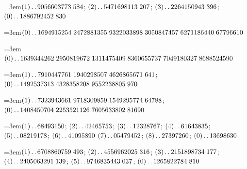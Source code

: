 \par\noindent\hangindent=3em\enspace $(1)\mathinner{.\,.}9056603773\;\allowbreak 584$; $(2)\mathinner{.\,.}5471698113\;\allowbreak 207$; $(3)\mathinner{.\,.}2264150943\;\allowbreak 396$; $(0)\mathinner{.\,.}1886792452\;\allowbreak 830$\par\smallskip

\par\noindent\hangindent=3em\enspace $(0)\mathinner{.\,.}1694915254\;\allowbreak 2472881355\;\allowbreak 9322033898\;\allowbreak 3050847457\;\allowbreak 6271186440\;\allowbreak 67796610$\par\smallskip

\par\noindent\hangindent=3em\enspace $(0)\mathinner{.\,.}1639344262\;\allowbreak 2950819672\;\allowbreak 1311475409\;\allowbreak 8360655737\;\allowbreak 7049180327\;\allowbreak 8688524590$\par\smallskip

\par\noindent\hangindent=3em\enspace $(1)\mathinner{.\,.}7910447761\;\allowbreak 1940298507\;\allowbreak 4626865671\;\allowbreak 641$; $(0)\mathinner{.\,.}1492537313\;\allowbreak 4328358208\;\allowbreak 9552238805\;\allowbreak 970$\par\smallskip

\par\noindent\hangindent=3em\enspace $(1)\mathinner{.\,.}7323943661\;\allowbreak 9718309859\;\allowbreak 1549295774\;\allowbreak 64788$; $(0)\mathinner{.\,.}1408450704\;\allowbreak 2253521126\;\allowbreak 7605633802\;\allowbreak 81690$\par\smallskip

\par\noindent\hangindent=3em\enspace $(1)\mathinner{.\,.}68493150$; $(2)\mathinner{.\,.}42465753$; $(3)\mathinner{.\,.}12328767$; $(4)\mathinner{.\,.}61643835$; $(5)\mathinner{.\,.}08219178$; $(6)\mathinner{.\,.}41095890$ $(7)\mathinner{.\,.}05479452$; $(8)\mathinner{.\,.}27397260$; $(0)\mathinner{.\,.}13698630$\par\smallskip

\par\noindent\hangindent=3em\enspace $(1)\mathinner{.\,.}6708860759\;\allowbreak 493$; $(2)\mathinner{.\,.}4556962025\;\allowbreak 316$; $(3)\mathinner{.\,.}2151898734\;\allowbreak 177$; $(4)\mathinner{.\,.}2405063291\;\allowbreak 139$; $(5)\mathinner{.\,.}9746835443\;\allowbreak 037$; $(0)\mathinner{.\,.}1265822784\;\allowbreak 810$\par\smallskip

